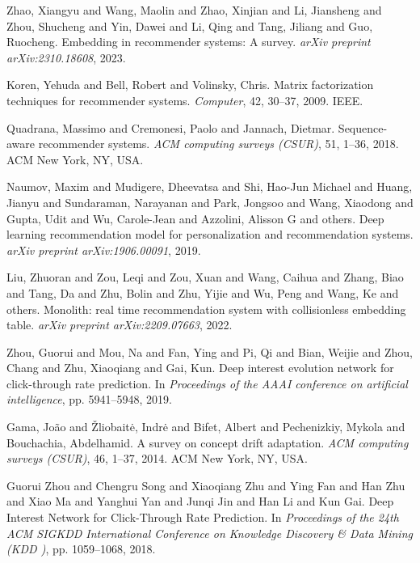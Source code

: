 \begin{thebibliography}{99}
 Zhao, Xiangyu and Wang, Maolin and Zhao, Xinjian and Li, Jiansheng and Zhou, Shucheng and Yin, Dawei and Li, Qing and Tang, Jiliang and Guo, Ruocheng. {E}mbedding in recommender systems: {A} survey. \textit{arXiv preprint arXiv:2310.18608}, 2023.

 Koren, Yehuda and Bell, Robert and Volinsky, Chris. {M}atrix factorization techniques for recommender systems. \textit{Computer}, 42, 30--37, 2009. IEEE.

 Quadrana, Massimo and Cremonesi, Paolo and Jannach, Dietmar. {S}equence-aware recommender systems. \textit{ACM computing surveys (CSUR)}, 51, 1--36, 2018. ACM New York, NY, USA.

 Naumov, Maxim and Mudigere, Dheevatsa and Shi, Hao-Jun Michael and Huang, Jianyu and Sundaraman, Narayanan and Park, Jongsoo and Wang, Xiaodong and Gupta, Udit and Wu, Carole-Jean and Azzolini, Alisson G and others. {D}eep learning recommendation model for personalization and recommendation systems. \textit{arXiv preprint arXiv:1906.00091}, 2019.

 Liu, Zhuoran and Zou, Leqi and Zou, Xuan and Wang, Caihua and Zhang, Biao and Tang, Da and Zhu, Bolin and Zhu, Yijie and Wu, Peng and Wang, Ke and others. {M}onolith: real time recommendation system with collisionless embedding table. \textit{arXiv preprint arXiv:2209.07663}, 2022.

 Zhou, Guorui and Mou, Na and Fan, Ying and Pi, Qi and Bian, Weijie and Zhou, Chang and Zhu, Xiaoqiang and Gai, Kun. {D}eep interest evolution network for click-through rate prediction. In \textit{Proceedings of the AAAI conference on artificial intelligence}, pp. 5941--5948, 2019.

 Gama, Jo{\~a}o and {\v Z}liobait{\.e}, Indr{\.e} and Bifet, Albert and Pechenizkiy, Mykola and Bouchachia, Abdelhamid. {A} survey on concept drift adaptation. \textit{ACM computing surveys (CSUR)}, 46, 1--37, 2014. ACM New York, NY, USA.

 Guorui Zhou and Chengru Song and Xiaoqiang Zhu and Ying Fan and  Han Zhu and Xiao Ma and Yanghui Yan and Junqi Jin and Han Li and Kun Gai. {D}eep {I}nterest {N}etwork for {C}lick-{T}hrough {R}ate {P}rediction. In \textit{Proceedings of the 24th ACM SIGKDD International Conference on 
Knowledge Discovery \& Data Mining (KDD )}, pp. 1059--1068, 2018.


\end{thebibliography}
